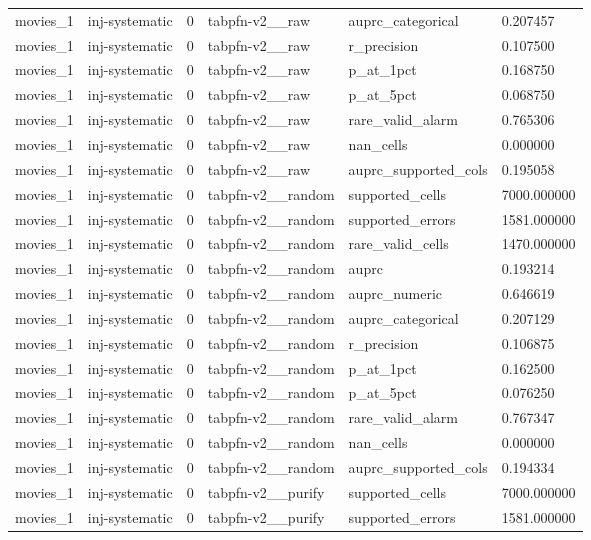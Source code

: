\begin{tabular}{llllll}
movies\_1 & inj-systematic & 0 & tabpfn-v2\_\_raw & auprc\_categorical & 0.207457 \\
movies\_1 & inj-systematic & 0 & tabpfn-v2\_\_raw & r\_precision & 0.107500 \\
movies\_1 & inj-systematic & 0 & tabpfn-v2\_\_raw & p\_at\_1pct & 0.168750 \\
movies\_1 & inj-systematic & 0 & tabpfn-v2\_\_raw & p\_at\_5pct & 0.068750 \\
movies\_1 & inj-systematic & 0 & tabpfn-v2\_\_raw & rare\_valid\_alarm & 0.765306 \\
movies\_1 & inj-systematic & 0 & tabpfn-v2\_\_raw & nan\_cells & 0.000000 \\
movies\_1 & inj-systematic & 0 & tabpfn-v2\_\_raw & auprc\_supported\_cols & 0.195058 \\
movies\_1 & inj-systematic & 0 & tabpfn-v2\_\_random & supported\_cells & 7000.000000 \\
movies\_1 & inj-systematic & 0 & tabpfn-v2\_\_random & supported\_errors & 1581.000000 \\
movies\_1 & inj-systematic & 0 & tabpfn-v2\_\_random & rare\_valid\_cells & 1470.000000 \\
movies\_1 & inj-systematic & 0 & tabpfn-v2\_\_random & auprc & 0.193214 \\
movies\_1 & inj-systematic & 0 & tabpfn-v2\_\_random & auprc\_numeric & 0.646619 \\
movies\_1 & inj-systematic & 0 & tabpfn-v2\_\_random & auprc\_categorical & 0.207129 \\
movies\_1 & inj-systematic & 0 & tabpfn-v2\_\_random & r\_precision & 0.106875 \\
movies\_1 & inj-systematic & 0 & tabpfn-v2\_\_random & p\_at\_1pct & 0.162500 \\
movies\_1 & inj-systematic & 0 & tabpfn-v2\_\_random & p\_at\_5pct & 0.076250 \\
movies\_1 & inj-systematic & 0 & tabpfn-v2\_\_random & rare\_valid\_alarm & 0.767347 \\
movies\_1 & inj-systematic & 0 & tabpfn-v2\_\_random & nan\_cells & 0.000000 \\
movies\_1 & inj-systematic & 0 & tabpfn-v2\_\_random & auprc\_supported\_cols & 0.194334 \\
movies\_1 & inj-systematic & 0 & tabpfn-v2\_\_purify & supported\_cells & 7000.000000 \\
movies\_1 & inj-systematic & 0 & tabpfn-v2\_\_purify & supported\_errors & 1581.000000 \\

\end{tabular}
